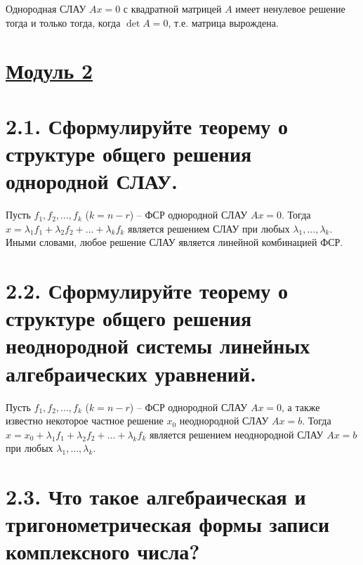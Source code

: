 \documentclass{article}
\begin{document}
Однородная СЛАУ $Ax = 0$ с квадратной матрицей $A$ имеет ненулевое решение тогда и только тогда, когда $\det{A} = 0$, т.е. матрица вырождена.

\newpage
{}
\section*{\LARGE\centering \underline{Модуль 2}}

\section*{\LARGE 2.1. Сформулируйте теорему о структуре общего решения однородной СЛАУ.  }

Пусть $f_1, f_2, ..., f_k$ ($k = n - r$) -- ФСР однородной СЛАУ $Ax = 0$. Тогда $x = \lambda_1f_1 + \lambda_2f_2 + ... + \lambda_kf_k$ является решением СЛАУ при любых $\lambda_1, ..., \lambda_k$. Иными словами, любое решение СЛАУ является линейной комбинацией ФСР.

\section*{\LARGE 2.2. Сформулируйте теорему о структуре общего решения неоднородной системы линейных алгебраических уравнений. }

Пусть $f_1, f_2, ..., f_k$ ($k = n - r$) -- ФСР однородной СЛАУ $Ax = 0$, а также известно некоторое частное решение $x_0$ неоднородной СЛАУ $Ax = b$. Тогда $x = x_0 + \lambda_1f_1 + \lambda_2f_2 + ... + \lambda_kf_k$ является решением неоднородной СЛАУ $Ax = b$ при любых $\lambda_1, ..., \lambda_k$.

\section*{\LARGE 2.3. Что такое алгебраическая и тригонометрическая формы записи комплексного числа? }
\end{document}
